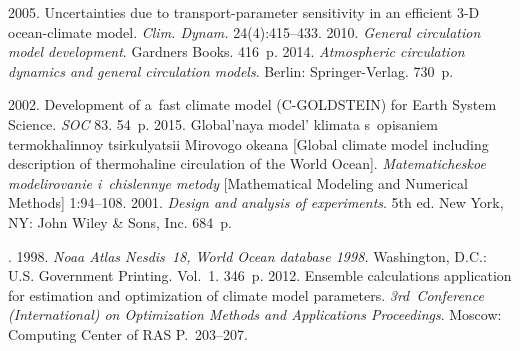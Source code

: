  \begin{multicols}{2}

\renewcommand{\bibname}{\protect\rmfamily References}

{\small\frenchspacing
 {%
 \begin{thebibliography}{9}
   2005. Uncertainties due to 
  transport-parameter sensitivity in an efficient 3-D ocean-climate model. 
  \textit{Clim. Dynam.} 24(4):415--433.
   2010. \textit{General circulation model development}. 
Gardners Books. 416~p.
   2014. \textit{Atmospheric circulation dynamics and general 
circulation models}. Berlin: Springer-Verlag. 730~p.

\columnbreak

   2002. Development of 
a~fast climate model (C-GOLDSTEIN) for Earth System Science. \textit{SOC}  83. 
54~p.
   2015. Global'naya model' klimata s~opisaniem 
termokhalinnoy tsirkulyatsii Mirovogo okeana [Global climate model including 
description of thermohaline circulation of the World Ocean].
  \textit{Matematicheskoe modelirovanie i~chislennye metody} [Mathematical 
Modeling and Numerical Methods] 1:94--108.
   2001. \textit{Design and analysis of experiments}. 5th 
ed. New York, NY: John Wiley \& Sons, Inc. 684~p.
{

}

\pagebreak

  . 1998. \textit{Noaa Atlas 
Nesdis~18, World Ocean database 1998.} Washington, D.C.: U.S. Government 
Printing. Vol.~1. 346~p.
   2012. Ensemble calculations application for estimation 
and optimization of climate model parameters. \textit{3rd~Conference (International) 
on Optimization Methods and Applications Proceedings}. Moscow: 
Computing Center of RAS P.~203--207. 
  \end{thebibliography}

 }
 }

\end{multicols}

